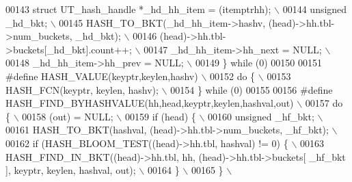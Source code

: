 \begin{DoxyCode}
00143 \textcolor{preprocessor}{  struct UT\_hash\_handle *\_hd\_hh\_item = (itemptrhh);                              \(\backslash\)}
00144 \textcolor{preprocessor}{  unsigned \_hd\_bkt;                                                              \(\backslash\)}
00145 \textcolor{preprocessor}{  HASH\_TO\_BKT(\_hd\_hh\_item->hashv, (head)->hh.tbl->num\_buckets, \_hd\_bkt);         \(\backslash\)}
00146 \textcolor{preprocessor}{  (head)->hh.tbl->buckets[\_hd\_bkt].count++;                                      \(\backslash\)}
00147 \textcolor{preprocessor}{  \_hd\_hh\_item->hh\_next = NULL;                                                   \(\backslash\)}
00148 \textcolor{preprocessor}{  \_hd\_hh\_item->hh\_prev = NULL;                                                   \(\backslash\)}
00149 \textcolor{preprocessor}{\} while (0)}
00150 
00151 \textcolor{preprocessor}{#define HASH\_VALUE(keyptr,keylen,hashv)                                          \(\backslash\)}
00152 \textcolor{preprocessor}{do \{                                                                             \(\backslash\)}
00153 \textcolor{preprocessor}{  HASH\_FCN(keyptr, keylen, hashv);                                               \(\backslash\)}
00154 \textcolor{preprocessor}{\} while (0)}
00155 
00156 \textcolor{preprocessor}{#define HASH\_FIND\_BYHASHVALUE(hh,head,keyptr,keylen,hashval,out)                 \(\backslash\)}
00157 \textcolor{preprocessor}{do \{                                                                             \(\backslash\)}
00158 \textcolor{preprocessor}{  (out) = NULL;                                                                  \(\backslash\)}
00159 \textcolor{preprocessor}{  if (head) \{                                                                    \(\backslash\)}
00160 \textcolor{preprocessor}{    unsigned \_hf\_bkt;                                                            \(\backslash\)}
00161 \textcolor{preprocessor}{    HASH\_TO\_BKT(hashval, (head)->hh.tbl->num\_buckets, \_hf\_bkt);                  \(\backslash\)}
00162 \textcolor{preprocessor}{    if (HASH\_BLOOM\_TEST((head)->hh.tbl, hashval) != 0) \{                         \(\backslash\)}
00163 \textcolor{preprocessor}{      HASH\_FIND\_IN\_BKT((head)->hh.tbl, hh, (head)->hh.tbl->buckets[ \_hf\_bkt ], keyptr, keylen, hashval,
       out); \(\backslash\)}
00164 \textcolor{preprocessor}{    \}                                                                            \(\backslash\)}
00165 \textcolor{preprocessor}{  \}                                                                              \(\backslash\)}

\end{DoxyCode}
